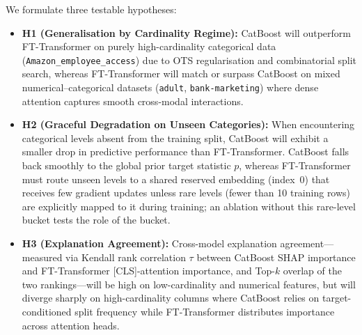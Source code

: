 \documentclass[twoside,11pt]{article}
\begin{document}
We formulate three testable hypotheses:
\begin{itemize}[leftmargin=*, nosep, topsep=2pt]
    \item \textbf{H1 (Generalisation by Cardinality Regime):} CatBoost will outperform FT-Transformer on purely high-cardinality categorical data (\texttt{Amazon\_employee\_access}) due to OTS regularisation and combinatorial split search, whereas FT-Transformer will match or surpass CatBoost on mixed numerical--categorical datasets (\texttt{adult}, \texttt{bank-marketing}) where dense attention captures smooth cross-modal interactions.
    \item \textbf{H2 (Graceful Degradation on Unseen Categories):} When encountering categorical levels absent from the training split, CatBoost will exhibit a smaller drop in predictive performance than FT-Transformer. CatBoost falls back smoothly to the global prior target statistic $p$, whereas FT-Transformer must route unseen levels to a shared reserved embedding (index~0) that receives few gradient updates unless rare levels (fewer than 10 training rows) are explicitly mapped to it during training; an ablation without this rare-level bucket tests the role of the bucket.
    \item \textbf{H3 (Explanation Agreement):} Cross-model explanation agreement—measured via Kendall rank correlation $\tau$ between CatBoost SHAP importance and FT-Transformer [CLS]-attention importance, and Top-$k$ overlap of the two rankings—will be high on low-cardinality and numerical features, but will diverge sharply on high-cardinality columns where CatBoost relies on target-conditioned split frequency while FT-Transformer distributes importance across attention heads.
\end{itemize}
\end{document}
